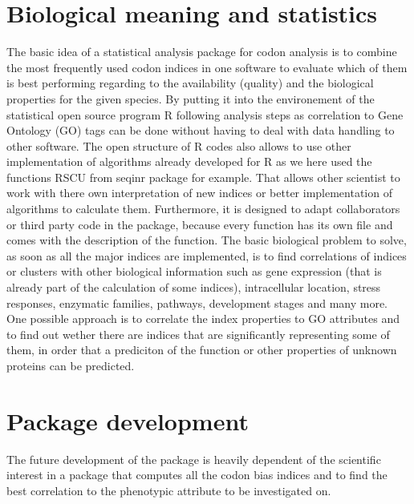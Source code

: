 \section{Biological meaning and statistics}
The basic idea of a statistical analysis package for codon analysis is to combine the most frequently used codon indices in one software to evaluate which of them is best performing regarding to the availability (quality) and the biological properties for the given species. By putting it into the environement of the statistical open source program R following analysis steps as correlation to Gene Ontology (GO) tags can be done without having to deal with data handling to other software. The open structure of R codes also allows to use other implementation of algorithms already developed for R as we here used the functions RSCU from seqinr package for example. That allows other scientist to work with there own interpretation of new indices or better implementation of algorithms to calculate them. Furthermore, it is designed to adapt collaborators or third party code in the package, because every function has its own file and comes with the description of the function.
The basic biological problem to solve, as soon as all the major indices are implemented, is to find correlations of indices or clusters with other biological information such as gene expression (that is already part of the calculation of some indices), intracellular location, stress responses, enzymatic families, pathways, development stages and many more. One possible approach is to correlate the index properties to GO attributes and to find out wether there are indices that are significantly representing some of them, in order that a prediciton of the function or other properties of unknown proteins can be predicted.

\section{Package development}
The future development of the package is heavily dependent of the scientific interest in a package that computes all the codon bias indices and to find the best correlation to the phenotypic attribute to be investigated on. 
